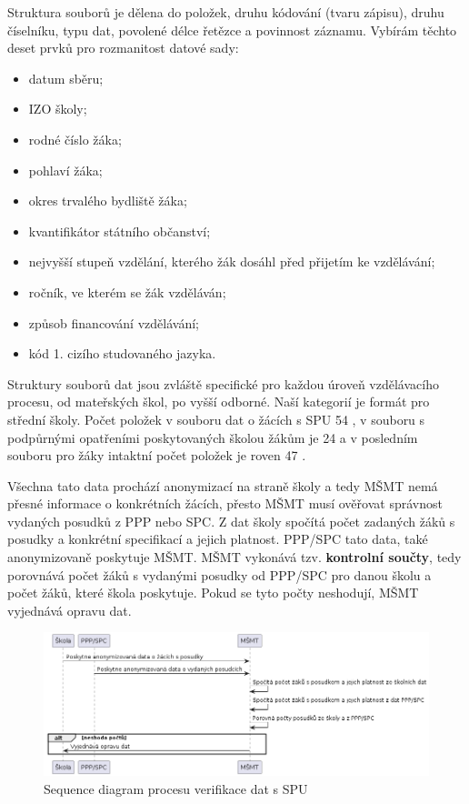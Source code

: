 \documentclass[FM,Proj]{tulthesis}
\begin{document}
Struktura souborů je dělena do položek, druhu kódování (tvaru zápisu),
druhu číselníku, typu dat, povolené délce řetězce a povinnost záznamu.
Vybírám těchto deset prvků pro rozmanitost datové sady:
\begin{itemize}
    \item datum sběru;
    \item IZO školy;
    \item rodné číslo žáka;
    \item pohlaví žáka;
    \item okres trvalého bydliště žáka;
    \item kvantifikátor státního občanství;
    \item nejvyšší stupeň vzdělání, kterého žák dosáhl před přijetím ke vzdělávání;
    \item ročník, ve kterém se žák vzděláván;
    \item způsob financování vzdělávání;
    \item kód 1. cizího studovaného jazyka.
\end{itemize}

Struktury souborů dat jsou zvláště specifické pro každou úroveň vzdělávacího procesu, 
od mateřských škol, po vyšší odborné. Naší kategorií je formát pro střední školy.
Počet položek v souboru dat o žácích s SPU 54 \cite{msmt-rozhrani-predavani-dat-2023},
v souboru s podpůrnými opatřeními poskytovaných školou žákům je 24 
\cite{msmt-rozhrani-predavani-dat-2023} a v posledním souboru pro žáky intaktní počet položek
je roven 47 \cite{msmt-rozhrani-predavani-dat-2023}.

Všechna tato data prochází anonymizací na straně školy a tedy MŠMT nemá přesné informace o konkrétních 
žácích, přesto MŠMT musí ověřovat správnost vydaných posudků z PPP nebo SPC. Z dat školy spočítá počet 
zadaných žáků s posudky a konkrétní specifikací a jejich platnost. PPP/SPC tato data, také anonymizovaně 
poskytuje MŠMT. MŠMT vykonává tzv. \textbf{kontrolní součty}, tedy porovnává počet žáků s vydanými posudky
od PPP/SPC pro danou školu a počet žáků, které škola poskytuje. Pokud se tyto počty neshodují, MŠMT
vyjednává opravu dat.

\begin{figure}[H]
    \includegraphics[width=\textwidth-28pt]{seq-kontrolni-soucty.png}
    \caption{Sequence diagram procesu verifikace dat s SPU}
    \label{fig:seq-kontrolni-soucty}
\end{figure}
\end{document}
